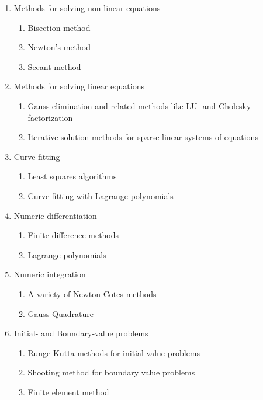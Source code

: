 \begin{enumerate}
\item Methods for solving non-linear equations
\begin{enumerate}
\item Bisection method
\item Newton's method
\item Secant method

\end{enumerate}
\item Methods for solving linear equations
\begin{enumerate}
\item Gauss elimination and related methods like LU- and Cholesky factorization
\item Iterative solution methods for sparse linear systems of equations
\end{enumerate}
\item Curve fitting
\begin{enumerate}
\item Least squares algorithms
\item Curve fitting with Lagrange polynomials
\end{enumerate}
\item Numeric differentiation
\begin{enumerate}
\item Finite difference methods
\item Lagrange polynomials
\end{enumerate}
\item Numeric integration
\begin{enumerate}
\item A variety of Newton-Cotes methods
\item Gauss Quadrature
\end{enumerate}

\item Initial- and Boundary-value problems 
\begin{enumerate}
\item Runge-Kutta methods for initial value problems
\item Shooting method for boundary value problems
\item Finite element method
\end{enumerate}

\end{enumerate}  

